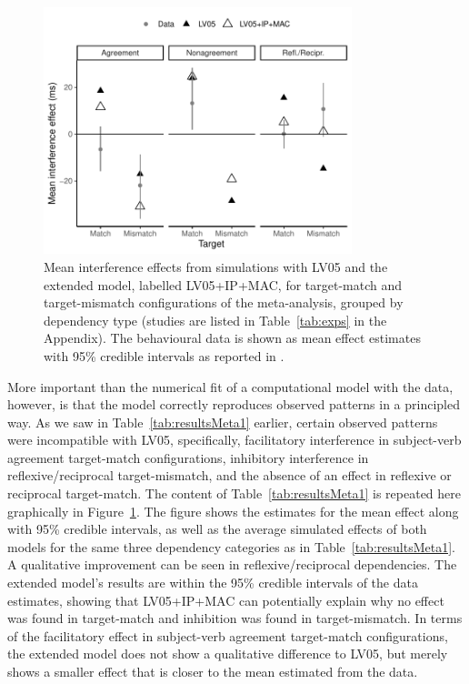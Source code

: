 \documentclass{cambridge7A}\usepackage[]{graphicx}\usepackage[]{color}
\begin{document}
\begin{figure}[!htbp]
\centering
\includegraphics[width=0.8\textwidth]{figures/fig-simresultsBayesMeans} 
\caption{Mean interference effects from simulations with LV05 and the extended model, labelled LV05+IP+MAC, for target-match and target-mismatch configurations of the meta-analysis, grouped by dependency type (studies are listed in Table~\ref{tab:exps} in the Appendix). The behavioural data is shown as mean effect estimates with 95\% credible intervals as reported in \cite{JaegerEngelmannVasishth2017}.}\label{fig:simresultsBayesMeans} 
\end{figure}
%


More important than the numerical fit of a computational model with the data, however, is that the model correctly reproduces observed patterns in a principled way. As we saw in Table~\ref{tab:resultsMeta1} earlier, certain observed patterns were incompatible with LV05, specifically, facilitatory interference in subject-verb agreement target-match configurations, inhibitory interference in reflexive/reciprocal target-mismatch, and the absence of an effect in reflexive or reciprocal target-match.
The content of Table~\ref{tab:resultsMeta1} is repeated here graphically in Figure~\ref{fig:simresultsBayesMeans}. The figure shows the estimates for the mean effect  along with 95\% credible intervals, as well as the average simulated effects of both models for the same three dependency categories as in Table~\ref{tab:resultsMeta1}.
A qualitative improvement can be seen in reflexive/reciprocal dependencies. The extended model's results are within the 95\% credible intervals of the data estimates, showing that LV05+IP+MAC can potentially explain why no effect was found in target-match and inhibition was found in target-mismatch.
In terms of the facilitatory effect in subject-verb agreement target-match configurations, the extended model does not show a qualitative difference to LV05, but merely shows a smaller effect that is closer to the mean estimated from the data.
\end{document}
